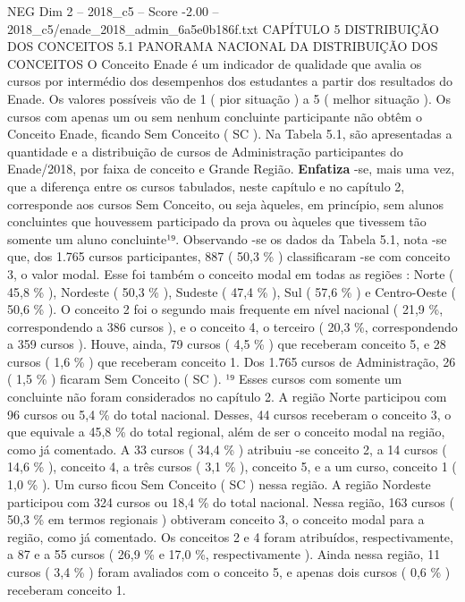 \begin{textsample}{NEG Dim 2 – 2018\_c5 – Score -2.00 – 2018\_c5/enade\_2018\_admin\_6a5e0b186f.txt}  \label{ex:f2_neg_114}
CAPÍTULO 5 DISTRIBUIÇÃO DOS CONCEITOS 5.1 PANORAMA NACIONAL DA DISTRIBUIÇÃO DOS CONCEITOS O Conceito Enade é um indicador de qualidade que avalia os cursos por intermédio dos desempenhos dos estudantes a partir dos resultados do Enade.
Os valores possíveis vão de 1 ( pior situação ) a 5 ( melhor situação ).
Os cursos com apenas um ou sem nenhum concluinte participante não obtêm o Conceito Enade, ficando Sem Conceito ( SC ).
Na Tabela 5.1, são apresentadas a quantidade e a distribuição de cursos de Administração participantes do Enade/2018, por faixa de conceito e Grande Região. \textbf{Enfatiza} -se, mais uma vez, que a diferença entre os cursos tabulados, neste capítulo e no capítulo 2, corresponde aos cursos Sem Conceito, ou seja àqueles, em princípio, sem alunos concluintes que houvessem participado da prova ou àqueles que tivessem tão somente um aluno concluinte¹⁹.
Observando -se os dados da Tabela 5.1, nota -se que, dos 1.765 cursos participantes, 887 ( 50,3 \% ) classificaram -se com conceito 3, o valor modal.
Esse foi também o conceito modal em todas as regiões : Norte ( 45,8 \% ), Nordeste ( 50,3 \% ), Sudeste ( 47,4 \% ), Sul ( 57,6 \% ) e Centro-Oeste ( 50,6 \% ).
O conceito 2 foi o segundo mais frequente em nível nacional ( 21,9 \%, correspondendo a 386 cursos ), e o conceito 4, o terceiro ( 20,3 \%, correspondendo a 359 cursos ).
Houve, ainda, 79 cursos ( 4,5 \% ) que receberam conceito 5, e 28 cursos ( 1,6 \% ) que receberam conceito 1.
Dos 1.765 cursos de Administração, 26 ( 1,5 \% ) ficaram Sem Conceito ( SC ). ¹⁹ Esses cursos com somente um concluinte não foram considerados no capítulo 2.
A região Norte participou com 96 cursos ou 5,4 \% do total nacional.
Desses, 44 cursos receberam o conceito 3, o que equivale a 45,8 \% do total regional, além de ser o conceito modal na região, como já comentado.
A 33 cursos ( 34,4 \% ) atribuiu -se conceito 2, a 14 cursos ( 14,6 \% ), conceito 4, a três cursos ( 3,1 \% ), conceito 5, e a um curso, conceito 1 ( 1,0 \% ).
Um curso ficou Sem Conceito ( SC ) nessa região.
A região Nordeste participou com 324 cursos ou 18,4 \% do total nacional.
Nessa região, 163 cursos ( 50,3 \% em termos regionais ) obtiveram conceito 3, o conceito modal para a região, como já comentado.
Os conceitos 2 e 4 foram atribuídos, respectivamente, a 87 e a 55 cursos ( 26,9 \% e 17,0 \%, respectivamente ).
Ainda nessa região, 11 cursos ( 3,4 \% ) foram avaliados com o conceito 5, e apenas dois cursos ( 0,6 \% ) receberam conceito 1.

\end{textsample}

